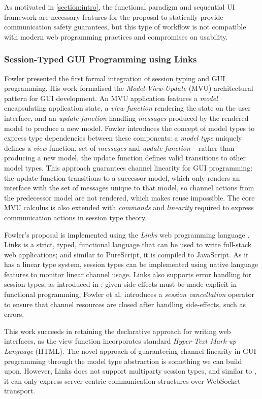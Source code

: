 As motivated in \cref{section:intro}, 
the functional paradigm and sequential UI framework
are necessary features for the proposal to statically 
provide communication safety guarantees, but 
this type of workflow is not compatible with 
modern web programming practices and compromises on usability.

\subsubsection{Session-Typed GUI Programming 
using Links \cite{MVU2020}}
Fowler presented the first formal integration
of session typing and GUI programming.
His work formalised the \textit{Model-View-Update} (MVU)
architectural pattern for GUI development.
An MVU application features a \textit{model} encapsulating application
state, a \textit{view function} rendering the state on the 
user interface, and an
\textit{update function} handling
\textit{messages} produced by the
rendered model to produce a new model.
Fowler introduces the concept of model types
to express type dependencies between these components:
a \emph{model type} uniquely defines a \textit{view} function,
set of \textit{messages} and \textit{update function} --
rather than producing a new model, the update function 
defines valid transitions to other model types.
This approach guarantees channel linearity for GUI programming:
the update function transitions to a successor model, which only
renders an interface with the set of messages unique to that model,
so channel actions from the predecessor model are not rendered,
which makes reuse impossible.
The core MVU calculus is also extended with \textit{commands}
and \textit{linearity} required to express communication
actions in session type theory.

Fowler's proposal \cite{MVU2020} is implemented using
the \textit{Links} web programming language
\cite{LINKS}. Links is a strict, typed, functional language
that can be used to write full-stack web applications;
and similar to PureScript, it is compiled to JavaScript.
As it has a linear type system, session types can be
implemented using native language features to
monitor linear channel usage.
Links also supports error handling for session types,
as introduced in \cite{Exceptional}; 
given side-effects must be made explicit
in functional programming,
Fowler et al. \cite{Exceptional} introduces
a \textit{session cancellation} operator to ensure
that channel resources are closed after handling
side-effects, such as errors.

This work succeeds in 
retaining the declarative approach for writing
web interfaces, as the view function incorporates standard
\textit{Hyper-Text Mark-up Language} (HTML).
The novel approach of guaranteeing channel linearity
in GUI programming through the model type abstraction
is something we can build upon. 
However, Links does not support multiparty session types,
and similar to \cite{PureScript2019},
it can only express server-centric communication structures
over WebSocket transport.